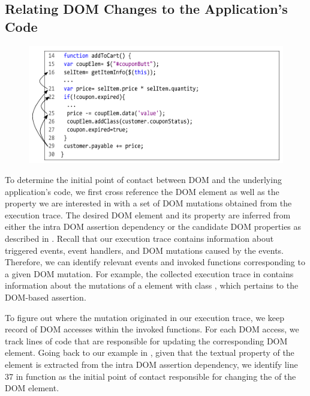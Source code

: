 \subsection{Relating DOM Changes to the Application's Code} \label{Sec:domToCode}
%
\begin{figure}[!t]
  \centering
  \includegraphics[width=1\hsize]{fig/intraCodeDep}
  \vspace{-0.2in} 
  \label{Fig:intraCodeDep}
\end{figure}
To determine the initial point of contact between DOM and the underlying application's code, we first cross reference the DOM element as well as the property we are interested in with a set of DOM mutations obtained from the execution trace. The desired DOM element and its property are inferred from either the intra DOM assertion dependency or the candidate DOM properties as described in . Recall that our execution trace contains information about triggered events, event handlers, and DOM mutations caused by the events. Therefore, we can identify relevant events and invoked functions corresponding to a given DOM mutation.
For example, the collected execution trace in  contains information about the mutations of a  element with class , which pertains to the DOM-based assertion.

To figure out where the mutation originated in our execution trace, we keep record of DOM accesses within the invoked functions. For each DOM access, we track \javascript lines of code that are responsible for updating the corresponding DOM element. Going back to our example in , given that the textual property of the  element is extracted from the intra DOM assertion dependency, we identify line 37 in function  as the initial point of contact responsible for changing the  of the DOM element.

